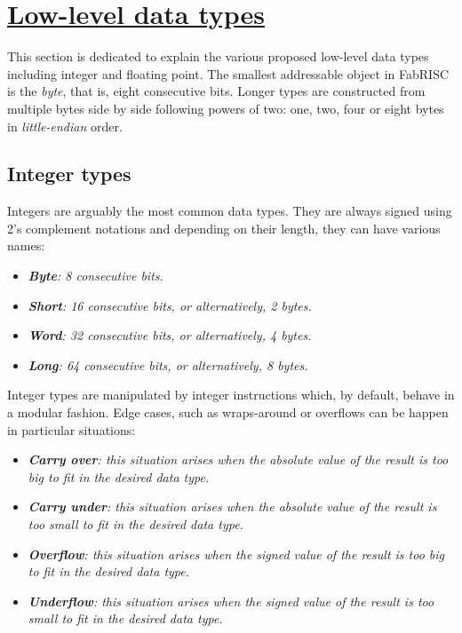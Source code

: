 \section[Low-level data types]{\LARGE\underline{Low-level data types}}

    \vspace{10pt}

    This section is dedicated to explain the various proposed low-level data types including integer and floating point. The smallest addressable object in FabRISC is the \textit{byte}, that is, eight consecutive bits. Longer types are constructed from multiple bytes side by side following powers of two: one, two, four or eight bytes in \textit{little-endian} order.

    \subsection{Integer types}

        Integers are arguably the most common data types. They are always signed using 2's complement notations and depending on their length, they can have various names:

        \begin{itemize}

            \item \textit{\textbf{Byte}: 8 consecutive bits.}
            \item \textit{\textbf{Short}: 16 consecutive bits, or alternatively, 2 bytes.}
            \item \textit{\textbf{Word}: 32 consecutive bits, or alternatively, 4 bytes.}
            \item \textit{\textbf{Long}: 64 consecutive bits, or alternatively, 8 bytes.}

        \end{itemize}

        Integer types are manipulated by integer instructions which, by default, behave in a modular fashion. Edge cases, such as wraps-around or overflows can be happen in particular situations:

        \begin{itemize}

            \item \textit{\textbf{Carry over}: this situation arises when the absolute value of the result is too big to fit in the desired data type.}

            \item \textit{\textbf{Carry under}: this situation arises when the absolute value of the result is too small to fit in the desired data type.}

            \item \textit{\textbf{Overflow}: this situation arises when the signed value of the result is too big to fit in the desired data type.}

            \item \textit{\textbf{Underflow}: this situation arises when the signed value of the result is too small to fit in the desired data type.}

        \end{itemize}

